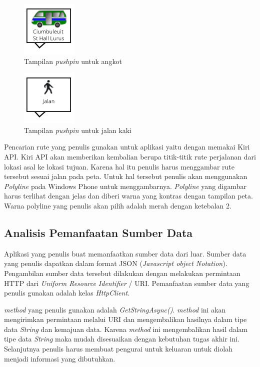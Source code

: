 \begin{figure}[h]
	\centering
		\includegraphics[scale=0.5]{Gambar/out_kiri/angkot}
	\caption{Tampilan \textit{pushpin} untuk angkot}
	\label{fig:pushpin_angkot}
\end{figure}

\begin{figure}[h]
	\centering
		\includegraphics[scale=0.5]{Gambar/out_kiri/jalan}
	\caption{Tampilan \textit{pushpin} untuk jalan kaki}
	\label{fig:pushpin_jalan}
\end{figure}

Pencarian rute yang penulis gunakan untuk aplikasi yaitu dengan memakai Kiri API. Kiri API akan memberikan kembalian berupa titik-titik rute perjalanan dari lokasi asal ke lokasi tujuan. Karena hal itu penulis harus menggambar rute tersebut sesuai jalan pada peta. Untuk hal tersebut penulis akan menggunakan \textit{Polyline} pada Windows Phone untuk menggambarnya. \textit{Polyline} yang digambar harus terlihat dengan jelas dan diberi warna yang kontras dengan tampilan peta. Warna polyline yang penulis akan pilih adalah merah dengan ketebalan 2.

\subsection{Analisis Pemanfaatan Sumber Data}
\label{lab:Analisis Pemanfaatan Sumber Data}
\hspace{0.5cm} Aplikasi yang penulis buat memanfaatkan sumber data dari luar. Sumber data yang penulis dapatkan dalam format JSON (\textit{Javascript object Notation}). Pengambilan sumber data tersebut dilakukan dengan melakukan permintaan HTTP dari \textit{Uniform Resource Identifier} / URI. Pemanfaatan sumber data yang penulis gunakan adalah kelas \textit{HttpClient}.

\textit{method} yang penulis gunakan adalah \textit{GetStringAsync()}. \textit{method} ini akan mengirimkan permintaan melalui URI dan mengembalikan hasilnya dalam tipe data \textit{String} dan kemajuan data. Karena \textit{method} ini mengembalikan hasil dalam tipe data \textit{String} maka mudah disesuaikan dengan kebutuhan tugas akhir ini. Selanjutnya penulis harus membuat pengurai untuk keluaran  untuk diolah menjadi informasi yang dibutuhkan.   

